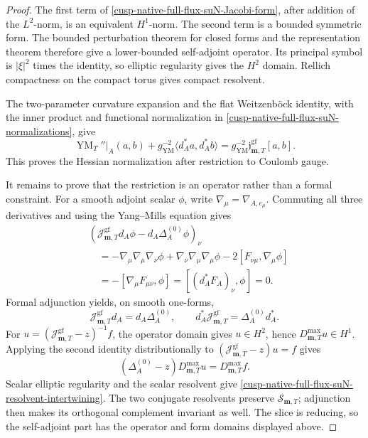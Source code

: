 \begin{proof}
The first term of
\cref{cusp-native-full-flux-suN-Jacobi-form}, after addition of the
\(L^2\)-norm, is an equivalent \(H^1\)-norm.  The second term is a bounded
symmetric form.  The bounded perturbation theorem for closed forms and the
representation theorem therefore give a lower-bounded self-adjoint
operator.  Its principal symbol is \(|\xi|^2\) times the identity, so
elliptic regularity gives the \(H^2\) domain.  Rellich compactness on the
compact torus gives compact resolvent.

The two-parameter curvature expansion and the flat Weitzenb\"ock identity,
with the inner product and functional normalization in
\cref{cusp-native-full-flux-suN-normalizations}, give
\[
 \operatorname{YM}_T''\big|_A(a,b)
 +g_{\mathrm{YM}}^{-2}\langle d_A^*a,d_A^*b\rangle
 =g_{\mathrm{YM}}^{-2}
   \mathfrak j_{\mathbf m,T}^{\mathrm{gf}}[a,b].
\]
This proves the Hessian normalization after restriction to Coulomb gauge.

It remains to prove that the restriction is an operator rather than a formal
constraint.  For a smooth adjoint scalar \(\phi\), write
\(\nabla_\mu=\nabla_{A,e_\mu}\).  Commuting all three derivatives and using
the Yang--Mills equation gives
\begin{align*}
 &(\mathcal J_{\mathbf m,T}^{\mathrm{gf}}d_A\phi
       -d_A\Delta_A^{(0)}\phi)_\nu\\
 &\quad=-\nabla_\mu\nabla_\mu\nabla_\nu\phi
       +\nabla_\nu\nabla_\mu\nabla_\mu\phi
       -2[F_{\nu\mu},\nabla_\mu\phi]\\
 &\quad=-[\nabla_\mu F_{\mu\nu},\phi]
       =[(d_A^*F_A)_\nu,\phi]=0.
\end{align*}
Formal adjunction yields, on smooth one-forms,
\begin{equation}
 \mathcal J_{\mathbf m,T}^{\mathrm{gf}}d_A
 =d_A\Delta_A^{(0)},
 \qquad
 d_A^*\mathcal J_{\mathbf m,T}^{\mathrm{gf}}
 =\Delta_A^{(0)}d_A^*.
 \label{cusp-native-full-flux-suN-formal-intertwining}
\end{equation}
For
\(u=(\mathcal J_{\mathbf m,T}^{\mathrm{gf}}-z)^{-1}f\), the operator domain
gives \(u\in H^2\), hence \(D_{\mathbf m,T}^{\max}u\in H^1\).  Applying the
second identity distributionally to
\((\mathcal J_{\mathbf m,T}^{\mathrm{gf}}-z)u=f\) gives
\[
 (\Delta_A^{(0)}-z)D_{\mathbf m,T}^{\max}u
 =D_{\mathbf m,T}^{\max}f.
\]
Scalar elliptic regularity and the scalar resolvent give
\cref{cusp-native-full-flux-suN-resolvent-intertwining}.  The two conjugate
resolvents preserve \(\mathscr S_{\mathbf m,T}\); adjunction then makes its
orthogonal complement invariant as well.  The slice is reducing, so the
self-adjoint part has the operator and form domains displayed above.
\end{proof}

